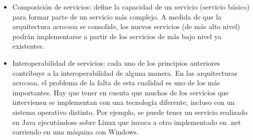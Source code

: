 \begin{itemize}
  \item Composición de servicios: define la capacidad de un servicio (servicio básico) para formar parte de un servicio más complejo. A medida de que la arquitectura \gls{acro:soa} se consolide, los nuevos servicios (de más alto nivel) podrán implementarse a partir de los servicios de más bajo nivel ya existentes.

  \item Interoperabilidad de servicios: cada uno de los principios anteriores contribuye a la interoperabilidad de alguna manera. En las arquitecturas \gls{acro:soa}, el problema de la falta de esta cualidad es uno de los más importantes. Hay que tener en cuenta que muchos de los servicios que intervienen se implementan con una tecnología diferente, incluso con un sistema operativo distinto. Por ejemplo, se puede tener un servicio realizado en Java ejecutándose sobre Linux que invoca a otro implementado en .net corriendo en una máquina con Windows.
\end{itemize}
